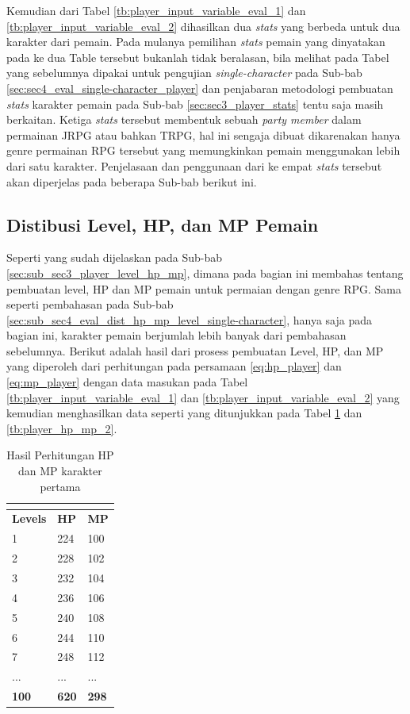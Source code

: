 Kemudian dari Tabel \ref{tb:player_input_variable_eval_1} dan \ref{tb:player_input_variable_eval_2} dihasilkan dua \textit{stats} yang berbeda untuk dua karakter dari pemain. Pada mulanya pemilihan \textit{stats} pemain yang dinyatakan pada ke dua Table tersebut bukanlah tidak beralasan, bila melihat pada Tabel yang sebelumnya dipakai untuk pengujian \textit{single-character} pada Sub-bab \ref{sec:sec4_eval_single-character_player} dan penjabaran metodologi pembuatan \textit{stats} karakter pemain pada Sub-bab \ref{sec:sec3_player_stats} tentu saja masih berkaitan. Ketiga \textit{stats} tersebut membentuk sebuah \textit{party member} dalam permainan JRPG atau bahkan TRPG, hal ini sengaja dibuat dikarenakan hanya genre permainan RPG tersebut yang memungkinkan pemain menggunakan lebih dari satu karakter. Penjelasaan dan penggunaan dari ke empat \textit{stats} tersebut akan diperjelas pada beberapa Sub-bab berikut ini.
\vspace{1ex}

\subsection{Distibusi Level, HP, dan MP Pemain}
\label{sec:sub_sec4_eval_dist_hp_mp_level_multi-character}
\vspace{1ex}

Seperti yang sudah dijelaskan pada Sub-bab \ref{sec:sub_sec3_player_level_hp_mp}, dimana pada bagian ini membahas tentang pembuatan level, HP dan MP pemain untuk permaian dengan genre RPG. Sama seperti pembahasan pada Sub-bab \ref{sec:sub_sec4_eval_dist_hp_mp_level_single-character}, hanya saja pada bagian ini, karakter pemain berjumlah lebih banyak dari pembahasan sebelumnya. Berikut adalah hasil dari prosess pembuatan Level, HP, dan MP yang diperoleh dari perhitungan pada persamaan \ref{eq:hp_player} dan \ref{eq:mp_player} dengan data masukan pada Tabel \ref{tb:player_input_variable_eval_1} dan \ref{tb:player_input_variable_eval_2} yang kemudian menghasilkan data seperti yang ditunjukkan pada Tabel \ref{tb:player_hp_mp_1} dan \ref{tb:player_hp_mp_2}.
\vspace{-1ex}

\begin{longtable}{|l|l|l|}
	\caption{Hasil Perhitungan HP dan MP karakter pertama}
	\vspace{1ex}
	\label{tb:player_hp_mp_1}\\
	\hline
	\rowcolor[HTML]{C0C0C0} 
	\textbf{Levels} & \textbf{HP} & \textbf{MP} \\ \hline
	1 & 224 & 100 \\ \hline
	2 & 228 & 102 \\ \hline
	3 & 232 & 104 \\ \hline
	4 & 236 & 106 \\ \hline
	5 & 240 & 108 \\ \hline
	6 & 244 & 110 \\ \hline
	7 & 248 & 112 \\ \hline
	... & ... & ... \\ \hline
	\textbf{100} & \textbf{620} & \textbf{298} \\ \hline
\end{longtable}
\vspace{-1ex}

